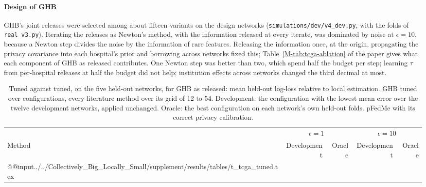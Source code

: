 \documentclass[acmsmall,screen,nonacm]{acmart}
\theoremstyle{acmdefinition}
\begin{document}
\paragraph{Design of GHB} GHB's joint releases were selected among about fifteen variants on the design networks (\texttt{simulations/dev/v4\_dev.py}, with the folds of \texttt{real\_v3.py}). Iterating the releases as Newton's method, with the information released at every iterate, was dominated by noise at $\epsilon=10$, because a Newton step divides the noise by the information of rare features. Releasing the information once, at the origin, propagating the privacy covariance into each hospital's prior and borrowing across networks fixed this; Table~\ref{M-tab:tcga-ablation} of the paper gives what each component of GHB as released contributes. One Newton step was better than two, which spend half the budget per step; learning $\tau$ from per-hospital releases at half the budget did not help; institution effects across networks changed the third decimal at most.

\begin{table}[t]
\caption{Tuned against tuned, on the five held-out networks, for GHB as released: mean held-out log-loss relative to local estimation. GHB tuned over \SimTTConfigs{} configurations, every literature method over its grid of 12 to 54. Development: the configuration with the lowest mean error over the twelve development networks, applied unchanged. Oracle: the best configuration on each network's own held-out folds. pFedMe \cite{tdinh2020personalized} with its correct privacy calibration.}
\label{tab:tcga-tuned}
\scriptsize
\begin{tabular}{@{}lrrrr@{}}
\toprule
 & \multicolumn{2}{c}{$\epsilon=1$} & \multicolumn{2}{c}{$\epsilon=10$}\\
\cmidrule(lr){2-3}\cmidrule(l){4-5}
Method & Development & Oracle & Development & Oracle\\
\midrule
\csname @@input\endcsname../../Collectively_Big_Locally_Small/supplement/results/tables/t_tcga_tuned.tex 
\bottomrule
\end{tabular}
\end{table}
\end{document}
